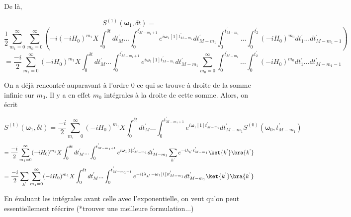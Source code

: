 De là,

\begin{equation*}
    S^{(1)}(\boldsymbol{\omega}_1, \delta t) = 
\end{equation*}
\begin{equation*}
    \frac{1}{2} \sum_{m_1 = 0}^{\infty}\sum_{m_0 = 0}^{\infty}\left(-i (-iH_0)^{m_1}X
    \int_{0}^{\delta t}dt_M^{'} ... \int_{0}^{t^{'}_{M-m_1+1}}e^{i\boldsymbol{\omega}_1[1]t^{'}_{M-m_1}} dt_{M-m_1}^{'}\int_{0}^{t^{'}_{M-m_1}}... \int_{0}^{t_2^{'}}(-iH_0)^{m_0} dt_1^{'} ... dt_{M - m_1 - 1}^{'}\right)
\end{equation*}
\begin{equation*}
    = \frac{-i}{2}\sum_{m_1 = 0}^{\infty}(-iH_0)^{m_1}X\int_{0}^{\delta t}dt^{'}_M ... \int_{0}^{t^{'}_{M-m_1+1}}e^{i\boldsymbol{\omega}_1[1]t^{'}_{M-m_1}} dt_{M-m_1}^{'}\sum_{m_0 = 0}^{\infty}\int_{0}^{t^{'}_{M-m_1}}... \int_{0}^{t_2^{'}}(-iH_0)^{m_0} dt_1^{'} ... dt_{M - m_1 - 1}^{'}
\end{equation*}

On a déjà rencontré auparavant à l'ordre 0 ce qui se trouve à droite de la somme infinie sur $m_0$. Il y a en effet $m_0$ intégrales à la droite de cette somme. Alors, on écrit

\begin{equation*}
    S^{(1)}(\boldsymbol{\omega}_1, \delta t) = \frac{-i}{2}\sum_{m_1 = 0}^{\infty}(-iH_0)^{m_1}X\int_{0}^{\delta t}dt^{'}_M ... \int_{0}^{t^{'}_{M-m_1+1}}e^{i\boldsymbol{\omega}_1[1]t^{'}_{M-m_1}} dt_{M-m_1}^{'}S^{(0)}(\boldsymbol{\omega}_0, t^{'}_{M-m_1})
\end{equation*}
\begin{equation*}
    = \frac{-i}{2}\sum_{m_1 = 0}^{\infty}(-iH_0)^{m_1}X\int_{0}^{\delta t}dt^{'}_M ... \int_{0}^{t^{'}_{M-m_1+1}}e^{i\boldsymbol{\omega}_1[1]t^{'}_{M-m_1}} dt_{M-m_1}^{'}\sum_{k^\text{'}}e^{-i\lambda_{k^\text{'}}t^{'}_{M-m_1}}\ket{k^\text{'}}\bra{k^\text{'}}
\end{equation*}
\begin{equation*}
    = \frac{-i}{2}\sum_{k^\text{'}}\sum_{m_1 = 0}^{\infty}(-iH_0)^{m_1}X\int_{0}^{\delta t}dt^{'}_M ... \int_{0}^{t^{'}_{M-m_1+1}}e^{-i(\lambda_{k^{'}}-\boldsymbol{\omega}_1[1])t^{'}_{M-m_1}} dt_{M-m_1}^{'}\ket{k^\text{'}}\bra{k^\text{'}}
\end{equation*}

En évaluant les intégrales avant celle avec l'exponentielle, on veut qu'on peut essentiellement réécrire (*trouver une meilleure formulation...)

